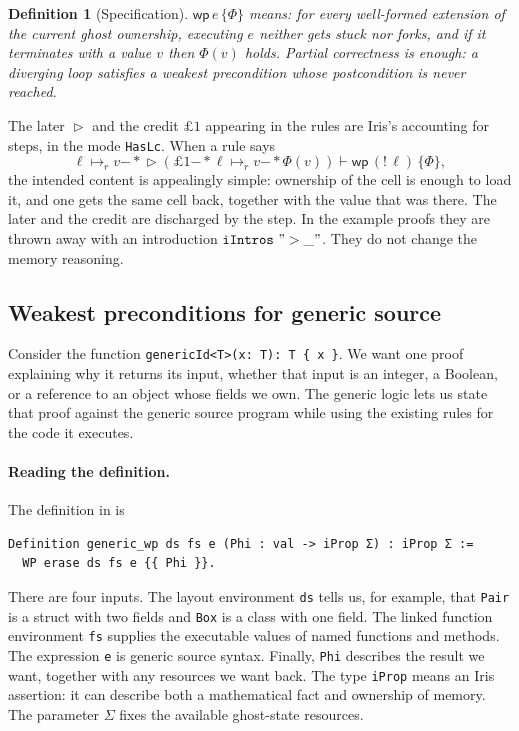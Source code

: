 \documentclass[11pt]{article}
\newtheorem{definition}[theorem]{Definition}
\newcommand{\ptsr}{\mathrel{\mapsto_{r}}}
\newcommand{\wand}{\mathbin{-\!\!*}}
\newcommand{\later}{\mathop{\triangleright}}
\newcommand{\Wpre}{\mathsf{wp}}
\begin{document}
\begin{definition}[Specification]
\(\Wpre\,e\,\{\Phi\}\) means: for every well-formed extension of the current ghost ownership, executing \(e\) neither gets stuck nor forks, and if it terminates with a value \(v\) then \(\Phi(v)\) holds.
Partial correctness is enough: a diverging loop satisfies a weakest precondition whose postcondition is never reached.
\end{definition}

The later \(\later\) and the credit \(\pounds 1\) appearing in the rules are Iris's accounting for steps, in the mode \texttt{HasLc}.
When a rule says
\[
\ell \ptsr v \wand \later(\pounds 1 \wand \ell \ptsr v \wand \Phi(v))
\vdash
\Wpre\,({!}\,\ell)\,\{\Phi\},
\]
the intended content is appealingly simple: ownership of the cell is enough to load it, and one gets the same cell back, together with the value that was there.
The later and the credit are discharged by the step.
In the example proofs they are thrown away with an introduction \(\mathtt{iIntros\ "> \_"}\).
They do not change the memory reasoning.

\subsection{Weakest preconditions for generic source}
\label{sec:generic-logic}

Consider the function \texttt{genericId<T>(x: T): T \{ x \}}.
We want one proof explaining why it returns its input, whether that input
is an integer, a Boolean, or a reference to an object whose fields we own.
The generic logic lets us state that proof against the generic source
program while using the existing rules for the code it executes.

\paragraph{Reading the definition.}
The definition in  is
\begin{lstlisting}
Definition generic_wp ds fs e (Phi : val -> iProp Σ) : iProp Σ :=
  WP erase ds fs e {{ Phi }}.
\end{lstlisting}
There are four inputs. The layout environment \texttt{ds} tells us, for
example, that \texttt{Pair} is a struct with two fields and \texttt{Box}
is a class with one field. The linked function environment \texttt{fs}
supplies the executable values of named functions and methods. The
expression \texttt{e} is generic source syntax. Finally, \texttt{Phi}
describes the result we want, together with any resources we want back.
The type \texttt{iProp} means an Iris assertion: it can describe both a
mathematical fact and ownership of memory. The parameter \(\Sigma\)
fixes the available ghost-state resources.
\end{document}
